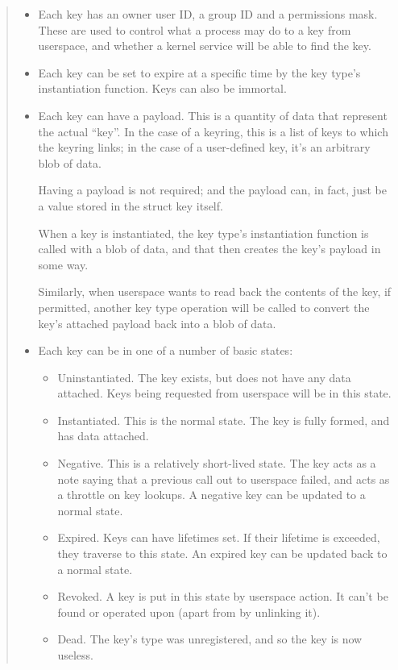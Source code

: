 \documentclass[a4paper,8pt,english]{sphinxmanual}
\begin{document}
\begin{quote}
\begin{itemize}
\item {} 
Each key has an owner user ID, a group ID and a permissions mask. These
are used to control what a process may do to a key from userspace, and
whether a kernel service will be able to find the key.

\item {} 
Each key can be set to expire at a specific time by the key type's
instantiation function. Keys can also be immortal.

\item {} 
Each key can have a payload. This is a quantity of data that represent the
actual ``key''. In the case of a keyring, this is a list of keys to which
the keyring links; in the case of a user-defined key, it's an arbitrary
blob of data.

Having a payload is not required; and the payload can, in fact, just be a
value stored in the struct key itself.

When a key is instantiated, the key type's instantiation function is
called with a blob of data, and that then creates the key's payload in
some way.

Similarly, when userspace wants to read back the contents of the key, if
permitted, another key type operation will be called to convert the key's
attached payload back into a blob of data.

\item {} 
Each key can be in one of a number of basic states:
\begin{itemize}
\item {} 
Uninstantiated. The key exists, but does not have any data attached.
Keys being requested from userspace will be in this state.

\item {} 
Instantiated. This is the normal state. The key is fully formed, and
has data attached.

\item {} 
Negative. This is a relatively short-lived state. The key acts as a
note saying that a previous call out to userspace failed, and acts as
a throttle on key lookups. A negative key can be updated to a normal
state.

\item {} 
Expired. Keys can have lifetimes set. If their lifetime is exceeded,
they traverse to this state. An expired key can be updated back to a
normal state.

\item {} 
Revoked. A key is put in this state by userspace action. It can't be
found or operated upon (apart from by unlinking it).

\item {} 
Dead. The key's type was unregistered, and so the key is now useless.

\end{itemize}

\end{itemize}
\end{quote}
\end{document}
